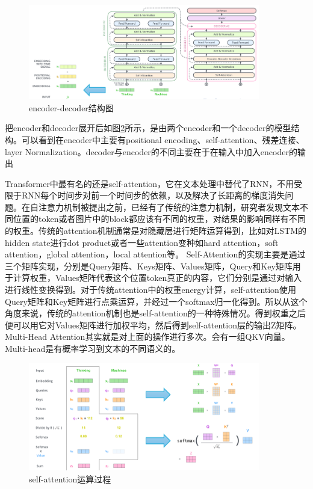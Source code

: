 \documentclass[a4paper, 12pt]{article}
\begin{document}
\begin{figure}[htbp]
    \centering
    \includegraphics[width=0.9\textwidth]{encoder-decoder}
    \caption{encoder-decoder结构图}
    \label{fig:encoder}
\end{figure}


把encoder和decoder展开后如图\ref{fig:encoder}所示，是由两个encoder和一个decoder的模型结构。可以看到在encoder中主要有positional encoding、self-attention、残差连接、layer Normalization。decoder与encoder的不同主要在于在输入中加入encoder的输出

Transformer中最有名的还是self-attention，它在文本处理中替代了RNN，不用受限于RNN每个时间步对前一个时间步的依赖，以及解决了长距离的梯度消失问题。在自注意力机制被提出之前，已经有了传统的注意力机制，研究者发现文本不同位置的token或者图片中的block都应该有不同的权重，对结果的影响同样有不同的权重。传统的attention机制通常是对隐藏层进行矩阵运算得到，比如对LSTM的hidden state进行dot product或者一些attention变种如hard attention，soft attention，global attention，local attention等。
Self-Attention的实现主要是通过三个矩阵实现，分别是Query矩阵、Keys矩阵、Values矩阵，Query和Key矩阵用于计算权重，Values矩阵代表这个位置token真正的内容，它们分别是通过对输入进行线性变换得到。对于传统attention中的权重energy计算，self-attention使用Query矩阵和Key矩阵进行点乘运算，并经过一个softmax归一化得到。所以从这个角度来说，传统的attention机制也是self-attention的一种特殊情况。得到权重之后便可以用它对Values矩阵进行加权平均，然后得到self-attention层的输出Z矩阵。
Multi-Head Attention其实就是对上面的操作进行多次。会有一组QKV向量。Multi-head是有概率学习到文本的不同语义的。

\begin{figure}[htbp]
    \centering
    \includegraphics[width=0.9\textwidth]{cal_process}
    \caption{self-attention运算过程}
    \label{fig:encoder}
\end{figure}
\end{document}
